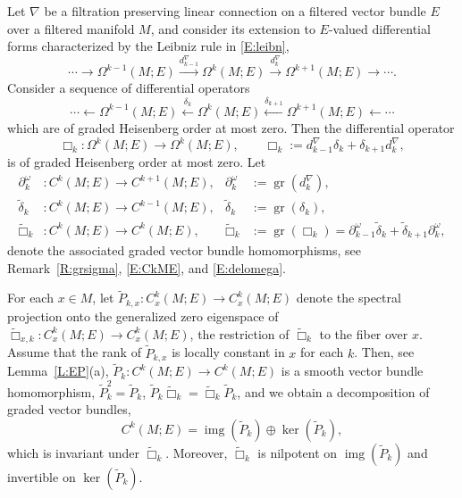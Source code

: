 \documentclass[reqno,12pt]{amsart}
\DeclareMathOperator{\img}{img}
\DeclareMathOperator{\gr}{gr}
\theoremstyle{plain}
\theoremstyle{definition}
\begin{document}
Let $\nabla$ be a filtration preserving linear connection on a filtered vector bundle $E$ over a filtered manifold $M$, and consider its extension to $E$-valued differential forms characterized by the Leibniz rule in \eqref{E:leibn},
\begin{equation}\label{E:Tdnabla}
\cdots\to\Omega^{k-1}(M;E)\xrightarrow{d^\nabla_{k-1}}\Omega^k(M;E)\xrightarrow{d^\nabla_k}\Omega^{k+1}(M;E)\to\cdots.
\end{equation}
Consider a sequence of differential operators
\begin{equation}\label{E:Tdelta}
\cdots\leftarrow\Omega^{k-1}(M;E)\xleftarrow{\delta_k}\Omega^k(M;E)\xleftarrow{\delta_{k+1}}\Omega^{k+1}(M;E)\leftarrow\cdots
\end{equation}
which are of graded Heisenberg order at most zero.
Then the differential operator
$$
\Box_k\colon\Omega^k(M;E)\to\Omega^k(M;E),\qquad
\Box_k:=d^\nabla_{k-1}\delta_k+\delta_{k+1}d^\nabla_k,
$$
is of graded Heisenberg order at most zero.
Let 
\begin{align*}
\partial_k^\omega&\colon C^k(M;E)\to C^{k+1}(M;E),&
\partial_k^\omega&:=\gr(d^\nabla_k),
\\
\tilde\delta_k&\colon C^k(M;E)\to C^{k-1}(M;E),&
\tilde\delta_k&:=\gr(\delta_k),
\\
\tilde\Box_k&\colon C^k(M;E)\to C^k(M;E),&
\tilde\Box_k&:=\gr(\Box_k)=\partial^\omega_{k-1}\tilde\delta_k+\tilde\delta_{k+1}\partial^\omega_k,
\end{align*}
denote the associated graded vector bundle homomorphisms, see Remark~\ref{R:grsigma}, \eqref{E:CkME}, and \eqref{E:delomega}.


For each $x\in M$, let $\tilde P_{k,x}\colon C_x^k(M;E)\to C_x^k(M;E)$ denote the spectral projection onto the generalized zero eigenspace of $\tilde\Box_{x,k}\colon C_x^k(M;E)\to C^k_x(M;E)$, the restriction of $\tilde\Box_k$ to the fiber over $x$.
Assume that the rank of $\tilde P_{k,x}$ is locally constant in $x$ for each $k$.
Then, see Lemma~\ref{L:EP}(a), $\tilde P_k\colon C^k(M;E)\to C^k(M;E)$ is a smooth vector bundle homomorphism,
$\tilde P_k^2=\tilde P_k$, $\tilde P_k\tilde\Box_k=\tilde\Box_k\tilde P_k$,  and we obtain a decomposition of graded vector bundles,
\begin{equation}\label{E:tpdeco2}
C^k(M;E)=\img(\tilde P_k)\oplus\ker(\tilde P_k),
\end{equation}
which is invariant under $\tilde\Box_k$.
Moreover, $\tilde\Box_k$ is nilpotent on $\img(\tilde P_k)$ and invertible on $\ker(\tilde P_k)$.
\end{document}
